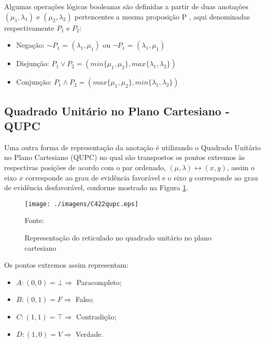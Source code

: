 Algumas operações lógicas booleanas são definidas 
a partir de duas anotações 
$(\mu _1, \lambda _1)$ e $(\mu _2, \lambda _2)$ 
pertencentes a mesma proposição P 
\cite{JISFeAS} \cite{Abe2014},
aqui denominadas respectivamente $P_1$ e $P_2$:

\begin{itemize}

\item Negação: $\sim$$P _1$ = $(\lambda _1, \mu _1)$ ou 
$\neg$$P _1$ = $(\lambda _1, \mu _1)$

\item Disjunção: $P _1 \vee P _2 = 
(min\{\mu _1, \mu _2\},max\{\lambda _1, \lambda _2\})$ 

\item Conjunção: $P _1 \wedge P _2 = 
(max\{\mu _1, \mu _2\},min\{\lambda _1, \lambda _2\})$ 


\end{itemize}




\subsection{Quadrado Unitário no Plano Cartesiano - QUPC}

Uma outra forma de representação da anotação é utilizando o Quadrado Unitário no Plano Cartesiano (QUPC) no qual são transpostos os pontos extremos às respectivas posições de acordo com o par ordenado,  $(\mu, \lambda ) \leftrightarrow (x,y) $, assim o eixo $x$ corresponde ao grau de evidência favorável e o eixo $y$ corresponde ao grau de evidência desfavorável, conforme mostrado na Figura \ref{fig:reticuladoQUPC}.



\begin{figure}[!htb]
\caption{Representação do reticulado no quadrado unitário no plano cartesiano}
\center\texttt{[image: ./imagens/C422qupc.eps]}
\label{fig:reticuladoQUPC}

{\small Fonte: \cite{JoaoInacio} }
\end{figure}

Os pontos extremos assim representam:

\begin{itemize}
\item $A: (0,0) = \bot \Rightarrow $ Paracompleto;
\item $B: (0,1) = F \Rightarrow $ Falso;
\item $C: (1,1) = \top \Rightarrow $ Contradição;
\item $D: (1,0) = V \Rightarrow $ Verdade.
\end{itemize}

